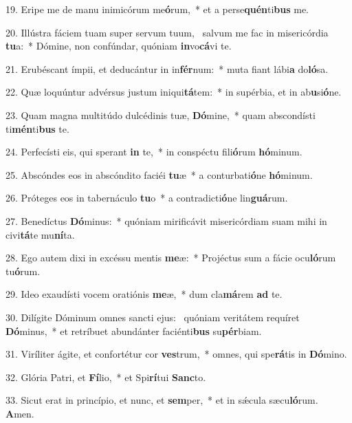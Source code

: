 19. Eripe me de manu inimicórum me\textbf{ó}rum,~*  et a perse\textbf{quén}ti\textbf{bus} me.\

20. Illústra fáciem tuam super servum tuum, \dag\  salvum me fac in misericórdia \textbf{tu}a:~*  Dómine, non confúndar, quóniam \textbf{in}vo\textbf{cá}vi te.\

21. Erubéscant ímpii, et deducántur in in\textbf{fér}num:~*  muta fiant lábi\textbf{a} do\textbf{ló}sa.\

22. Quæ loquúntur advérsus justum iniqui\textbf{tá}tem:~*  in supérbia, et in ab\textbf{u}si\textbf{ó}ne.\

23. Quam magna multitúdo dulcédinis tuæ, \textbf{Dó}mine,~*  quam abscondísti ti\textbf{mén}ti\textbf{bus} te.\

24. Perfecísti eis, qui sperant \textbf{in} te,~*  in conspéctu fili\textbf{ó}rum \textbf{hó}minum.\

25. Abscóndes eos in abscóndito faciéi \textbf{tu}æ~*  a conturbati\textbf{ó}ne \textbf{hó}minum.\

26. Próteges eos in tabernáculo \textbf{tu}o~*  a contradicti\textbf{ó}ne lin\textbf{guá}rum.\

27. Benedíctus \textbf{Dó}minus:~*  quóniam mirificávit misericórdiam suam mihi in civi\textbf{tá}te mu\textbf{ní}ta.\

28. Ego autem dixi in excéssu mentis \textbf{me}æ:~*  Projéctus sum a fácie ocu\textbf{ló}rum tu\textbf{ó}rum.\

29. Ideo exaudísti vocem oratiónis \textbf{me}æ,~*  dum cla\textbf{má}rem \textbf{ad} te.\

30. Dilígite Dóminum omnes sancti ejus: \dag\  quóniam veritátem requíret \textbf{Dó}minus,~*  et retríbuet abundánter faciénti\textbf{bus} su\textbf{pér}biam.\

31. Viríliter ágite, et confortétur cor \textbf{ves}trum,~*  omnes, qui spe\textbf{rá}tis in \textbf{Dó}mino.\

32. Glória Patri, et \textbf{Fí}lio,~*  et Spi\textbf{rí}tui \textbf{Sanc}to.\

33. Sicut erat in princípio, et nunc, et \textbf{sem}per,~*  et in sǽcula sæcu\textbf{ló}rum. \textbf{A}men.\

